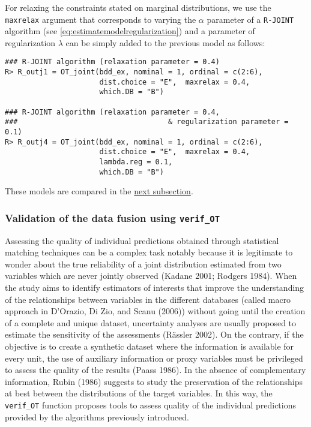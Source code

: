 For relaxing the constraints stated on marginal distributions, we use the \texttt{maxrelax} argument that corresponds to varying the \(\alpha\) parameter of a \texttt{R-JOINT} algorithm (see \eqref{eq:estimatemodelregularization}) and a parameter of regularization \(\lambda\) can be simply added to the previous model as follows:

\begin{verbatim}
### R-JOINT algorithm (relaxation parameter = 0.4)
R> R_outj1 = OT_joint(bdd_ex, nominal = 1, ordinal = c(2:6), 
                      dist.choice = "E",  maxrelax = 0.4,
                      which.DB = "B")

### R-JOINT algorithm (relaxation parameter = 0.4,
###                                   & regularization parameter = 0.1)
R> R_outj4 = OT_joint(bdd_ex, nominal = 1, ordinal = c(2:6), 
                      dist.choice = "E",  maxrelax = 0.4,
                      lambda.reg = 0.1,
                      which.DB = "B")
\end{verbatim}

These models are compared in the \protect\hyperlink{vodf}{next subsection}.

\hypertarget{vodf}{%
\subsubsection{\texorpdfstring{Validation of the data fusion using \texttt{verif\_OT}}{Validation of the data fusion using verif\_OT}}\label{vodf}}

Assessing the quality of individual predictions obtained through statistical matching techniques can be a complex task notably because it is legitimate to wonder about the true reliability of a joint distribution estimated from two variables which are never jointly observed (Kadane 2001; Rodgers 1984). When the study aims to identify estimators of interests that improve the understanding of the relationships between variables in the different databases (called macro approach in D'Orazio, Di Zio, and Scanu (2006)) without going until the creation of a complete and unique dataset, uncertainty analyses are usually proposed to estimate the sensitivity of the assessments (Rässler 2002). On the contrary, if the objective is to create a synthetic dataset where the information is available for every unit, the use of auxiliary information or proxy variables must be privileged to assess the quality of the results (Paass 1986). In the absence of complementary information, Rubin (1986) suggests to study the preservation of the relationships at best between the distributions of the target variables. In this way, the \texttt{verif\_OT} function proposes tools to assess quality of the individual predictions provided by the algorithms previously introduced.

